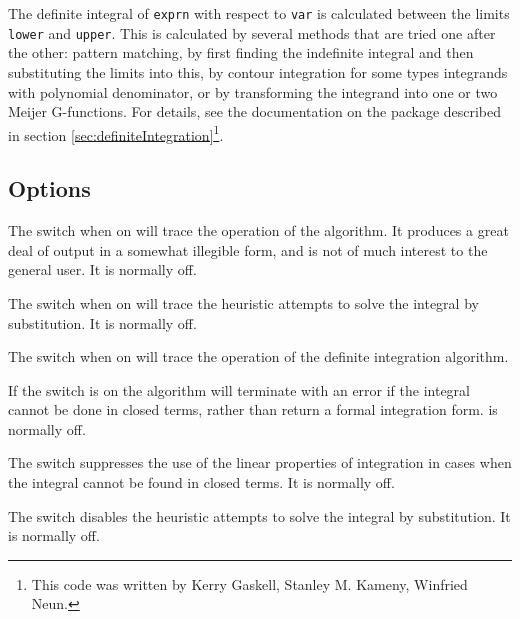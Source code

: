 The definite integral of \texttt{exprn} with respect to \texttt{var} is
calculated between the limits \texttt{lower} and \texttt{upper}.
This is calculated by several methods that are tried one after the other:
pattern matching, by first finding
the indefinite integral and then substituting the limits into this,
by contour integration for some types integrands with polynomial denominator, or
by transforming the integrand into one or two Meijer G-functions.
For details, see
the documentation on the  package described
in section \ref{sec:definiteIntegration}\footnote{This code was written by
Kerry Gaskell, Stanley M. Kameny, Winfried Neun.}.


\subsection{Options}
\hypertarget{switch:TRINT}{}
\hypertarget{switch:TRINTSUBST}{}
\hypertarget{switch:TRDEFINT}{}
\hypertarget{switch:FAILHARD}{}
\hypertarget{switch:NOLNR}{}
\hypertarget{switch:NOINTSUBST}{}

The switch  when on will trace the operation of the algorithm. It
produces a great deal of output in a somewhat illegible form, and is not
of much interest to the general user. It is normally off.

The switch  when on will trace the heuristic attempts to
solve the integral by substitution. It is normally off.

The switch  when on will trace the operation of the definite integration algorithm.

If the switch  is on the algorithm will terminate with an
error if the integral cannot be done in closed terms, rather than return a
formal integration form.  is normally off.

The switch  suppresses the use of the linear properties of
integration in cases when the integral cannot be found in closed terms.
It is normally off.

The switch  disables the heuristic attempts to solve
the integral by substitution. It is normally off.

